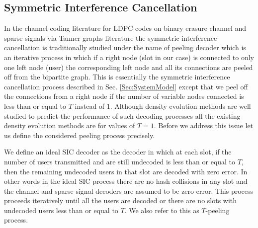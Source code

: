 \subsection{Symmetric Interference Cancellation}
\label{sec:SICanalysis}
In the channel coding literature for LDPC codes on binary erasure channel and sparse signals via Tanner graphs literature the symmetric interference cancellation is traditionally studied under the name of peeling decoder which is an iterative process in which if a right node (slot in our case) is connected to only one left node (user) the corresponding left node and all its connections are peeled off from the bipartite graph. This is essentially the symmetric interference cancellation process described in Sec. \ref{Sec:SystemModel} except that we peel off the connections from a right node if the number of variable nodes connected is less than or equal to $T$ instead of $1$. Although density evolution methods are well studied to predict the performance of such decoding processes all the existing density evolution methods are for values of $T=1$. Before we address this issue let us define the considered peeling process precisely.
\begin{definition}[$T$-peeling]
\label{def:T-peeling_process}
We define an ideal SIC decoder as the decoder in which at each slot, if the number of users transmitted and are still undecoded is less than or equal to $T$, then the remaining undecoded users in that slot are decoded with zero error. In other words in the ideal SIC process there are no hash collisions in any slot and the channel and sparse signal decoders are assumed to be zero-error. This process proceeds iteratively until all the users are decoded or there are no slots with undecoded users less than or equal to $T$. We also refer to this as $T$-peeling process.
\end{definition}

